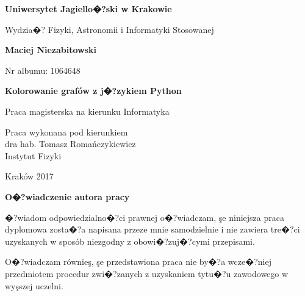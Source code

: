 \documentclass[12pt,a4paper]{mwrep}
\begin{document}
\setcounter{secnumdepth}{3}
\begin{titlepage}

\begin{center}
\textbf{\Large Uniwersytet Jagiello�?ski w Krakowie}
\end{center}

\begin{center}
Wydzia�? Fizyki, Astronomii i Informatyki Stosowanej
\end{center}

\vfill
\begin{center}
\textbf{\large Maciej Niezabitowski}
\end{center}

\begin{center}
Nr albumu: 1064648
\end{center}

\vfill
\begin{center}
\textbf{\LARGE Kolorowanie grafów z j�?zykiem Python}
\end{center}

\begin{center}
Praca magisterska na kierunku Informatyka
\end{center}

\vfill
\begin{flushright}
Praca wykonana pod kierunkiem\\
dra hab. Tomasz Romańczykiewicz \\
Instytut Fizyki
\end{flushright}

\vfill
\begin{center}
Kraków 2017
\end{center}

\end{titlepage}


\thispagestyle{empty}

\begin{flushleft}
\textbf{\large O�?wiadczenie autora pracy}
\end{flushleft}

�?wiadom odpowiedzialno�?ci prawnej o�?wiadczam, şe niniejsza
praca dyplomowa zosta�?a napisana przeze mnie samodzielnie
i nie zawiera tre�?ci uzyskanych w sposób niezgodny
z obowi�?zuj�?cymi przepisami.

O�?wiadczam równieş, şe przedstawiona praca nie by�?a wcze�?niej
przedmiotem procedur zwi�?zanych z uzyskaniem tytu�?u
zawodowego w wyşszej uczelni.
\end{document}
